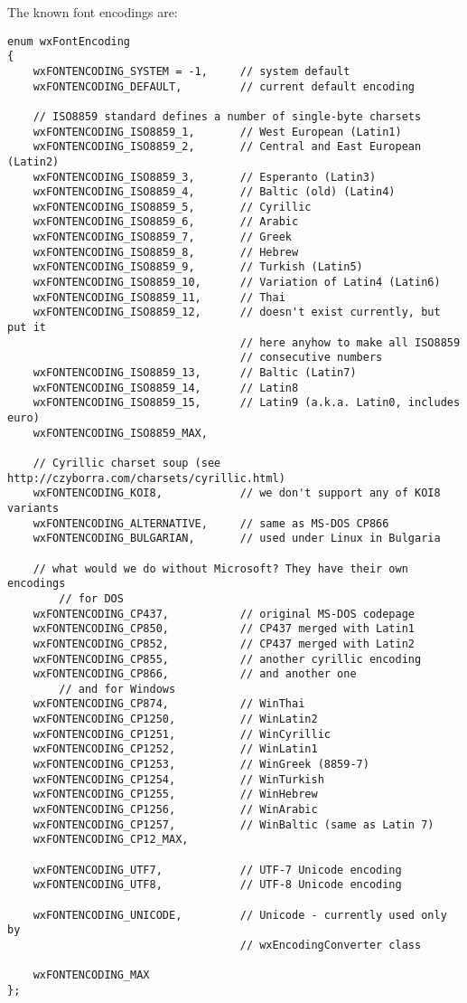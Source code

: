 The known font encodings are:
\begin{verbatim}
enum wxFontEncoding
{
    wxFONTENCODING_SYSTEM = -1,     // system default
    wxFONTENCODING_DEFAULT,         // current default encoding

    // ISO8859 standard defines a number of single-byte charsets
    wxFONTENCODING_ISO8859_1,       // West European (Latin1)
    wxFONTENCODING_ISO8859_2,       // Central and East European (Latin2)
    wxFONTENCODING_ISO8859_3,       // Esperanto (Latin3)
    wxFONTENCODING_ISO8859_4,       // Baltic (old) (Latin4)
    wxFONTENCODING_ISO8859_5,       // Cyrillic
    wxFONTENCODING_ISO8859_6,       // Arabic
    wxFONTENCODING_ISO8859_7,       // Greek
    wxFONTENCODING_ISO8859_8,       // Hebrew
    wxFONTENCODING_ISO8859_9,       // Turkish (Latin5)
    wxFONTENCODING_ISO8859_10,      // Variation of Latin4 (Latin6)
    wxFONTENCODING_ISO8859_11,      // Thai
    wxFONTENCODING_ISO8859_12,      // doesn't exist currently, but put it
                                    // here anyhow to make all ISO8859
                                    // consecutive numbers
    wxFONTENCODING_ISO8859_13,      // Baltic (Latin7)
    wxFONTENCODING_ISO8859_14,      // Latin8
    wxFONTENCODING_ISO8859_15,      // Latin9 (a.k.a. Latin0, includes euro)
    wxFONTENCODING_ISO8859_MAX,

    // Cyrillic charset soup (see http://czyborra.com/charsets/cyrillic.html)
    wxFONTENCODING_KOI8,            // we don't support any of KOI8 variants
    wxFONTENCODING_ALTERNATIVE,     // same as MS-DOS CP866
    wxFONTENCODING_BULGARIAN,       // used under Linux in Bulgaria

    // what would we do without Microsoft? They have their own encodings
        // for DOS
    wxFONTENCODING_CP437,           // original MS-DOS codepage
    wxFONTENCODING_CP850,           // CP437 merged with Latin1
    wxFONTENCODING_CP852,           // CP437 merged with Latin2
    wxFONTENCODING_CP855,           // another cyrillic encoding
    wxFONTENCODING_CP866,           // and another one
        // and for Windows
    wxFONTENCODING_CP874,           // WinThai
    wxFONTENCODING_CP1250,          // WinLatin2
    wxFONTENCODING_CP1251,          // WinCyrillic
    wxFONTENCODING_CP1252,          // WinLatin1
    wxFONTENCODING_CP1253,          // WinGreek (8859-7)
    wxFONTENCODING_CP1254,          // WinTurkish
    wxFONTENCODING_CP1255,          // WinHebrew
    wxFONTENCODING_CP1256,          // WinArabic
    wxFONTENCODING_CP1257,          // WinBaltic (same as Latin 7)
    wxFONTENCODING_CP12_MAX,

    wxFONTENCODING_UTF7,            // UTF-7 Unicode encoding
    wxFONTENCODING_UTF8,            // UTF-8 Unicode encoding

    wxFONTENCODING_UNICODE,         // Unicode - currently used only by
                                    // wxEncodingConverter class

    wxFONTENCODING_MAX
};
\end{verbatim}

